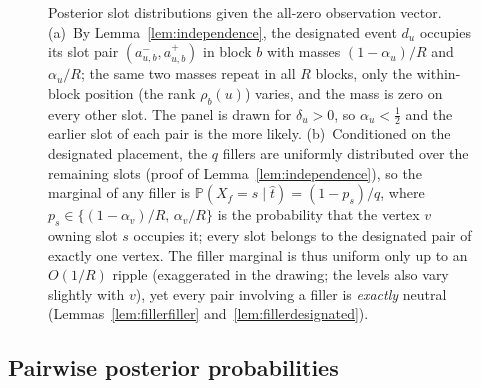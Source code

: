 \documentclass[11pt]{article}
\newcommand{\Prb}{\mathbb{P}}
\begin{document}
\begin{figure}[ht]

\caption{Posterior slot distributions given the all-zero observation vector.
(a)~By Lemma~\ref{lem:independence}, the designated event $d_u$ occupies its
slot pair $(a^-_{u,b},a^+_{u,b})$ in block $b$ with masses $(1-\alpha_u)/R$
and $\alpha_u/R$; the same two masses repeat in all $R$ blocks, only the
within-block position (the rank $\rho_b(u)$) varies, and the mass is zero on
every other slot.  The panel is drawn for $\delta_u>0$, so $\alpha_u<\tfrac12$
and the earlier slot of each pair is the more likely.
(b)~Conditioned on the designated placement, the $q$ fillers are uniformly
distributed over the remaining slots (proof of
Lemma~\ref{lem:independence}), so the marginal of any filler is
$\Prb(X_f=s\mid\hat t)=(1-p_s)/q$, where
$p_s\in\{(1-\alpha_v)/R,\,\alpha_v/R\}$ is the probability that the vertex $v$
owning slot $s$ occupies it; every slot belongs to the designated pair of
exactly one vertex.  The filler marginal is thus uniform only up to an
$O(1/R)$ ripple (exaggerated in the drawing; the levels also vary slightly
with $v$), yet every pair involving a filler is \emph{exactly} neutral
(Lemmas~\ref{lem:fillerfiller} and~\ref{lem:fillerdesignated}).}
\label{fig:posteriors}
\end{figure}

\subsection*{Pairwise posterior probabilities}
\end{document}
